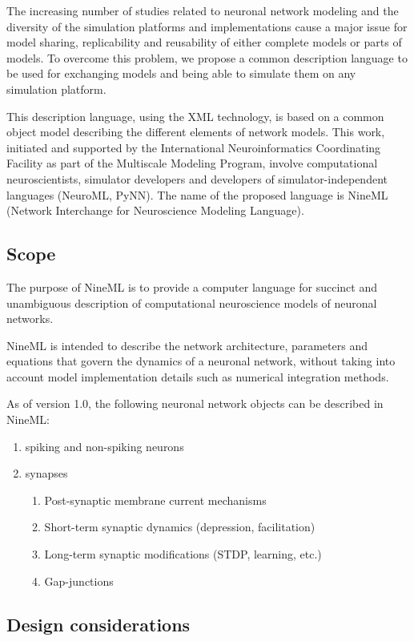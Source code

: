 \documentclass[draftspec]{ninemlspec}
\begin{document}
The increasing number of studies related to neuronal network modeling
and the diversity of the simulation platforms and implementations
cause a major issue for model sharing, replicability and reusability
of either complete models or parts of models. To overcome this problem,
we propose a
common description language to be used for exchanging models and being
able to simulate them on any simulation platform.

This description language, using the XML technology, is based on a
common object model describing the different elements of network
models. This work, initiated and supported by the International
Neuroinformatics Coordinating Facility as part of the Multiscale Modeling
Program, involve computational neuroscientists, simulator developers and
developers of simulator-independent languages (NeuroML, PyNN).  The name of the
proposed language is NineML (Network Interchange for Neuroscience Modeling
Language).

\subsection{Scope}

The purpose of NineML is to provide a computer language for
succinct and unambiguous description of computational neuroscience models of neuronal networks.

NineML is intended to describe the network architecture, parameters
and equations that govern the dynamics of a neuronal network, without
taking into account model implementation details such as numerical integration
methods.

As of version 1.0, the following neuronal
network objects can be described in NineML:
\begin{enumerate}
\item spiking and non-spiking neurons
\item synapses
\begin{enumerate}
\item Post-synaptic membrane current mechanisms
\item Short-term synaptic dynamics (depression, facilitation)
\item Long-term synaptic modifications (STDP, learning, etc.)
\item Gap-junctions
\end{enumerate}
\end{enumerate}

\subsection{Design considerations}
\label{sec:design_considerations}
\end{document}
